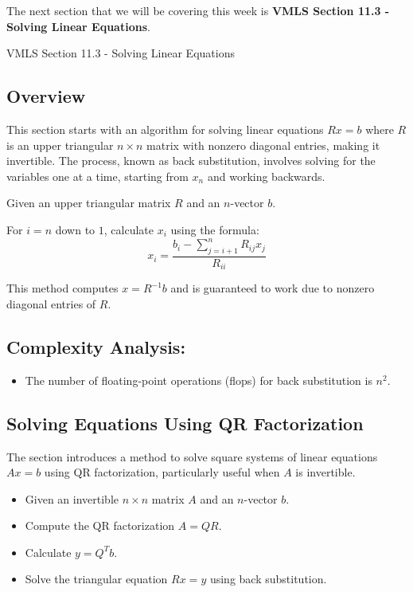 The next section that we will be covering this week is \textbf{VMLS Section 11.3 - Solving Linear Equations}. 

\begin{notes}{VMLS Section 11.3 - Solving Linear Equations}
    \subsection*{Overview}

    This section starts with an algorithm for solving linear equations $Rx = b$ where $R$ is an upper triangular $n \times n$ matrix with nonzero diagonal entries, making it invertible. The process, 
    known as back substitution, involves solving for the variables one at a time, starting from $x_n$ and working backwards. \vspace*{1em}

    \begin{highlight}
        \item Given an upper triangular matrix $R$ and an $n$-vector $b$.
        \item For $i = n$ down to $1$, calculate $x_i$ using the formula:
        \begin{equation*}
            x_i = \frac{b_i - \sum_{j=i+1}^{n} R_{ij}x_j}{R_{ii}}
        \end{equation*}
        \item This method computes $x = R^{-1}b$ and is guaranteed to work due to nonzero diagonal entries of $R$.
    \end{highlight}

    \subsection*{Complexity Analysis:}
    \begin{itemize}
        \item The number of floating-point operations (flops) for back substitution is $n^2$.
    \end{itemize}

    \subsection*{Solving Equations Using QR Factorization}
    The section introduces a method to solve square systems of linear equations $Ax = b$ using QR factorization, particularly useful when $A$ is invertible.

    \begin{highlight}
        \begin{itemize}
            \item Given an invertible $n \times n$ matrix $A$ and an $n$-vector $b$.
            \item Compute the QR factorization $A = QR$.
            \item Calculate $y = Q^Tb$.
            \item Solve the triangular equation $Rx = y$ using back substitution.
        \end{itemize}
    \end{highlight}


\end{notes}
